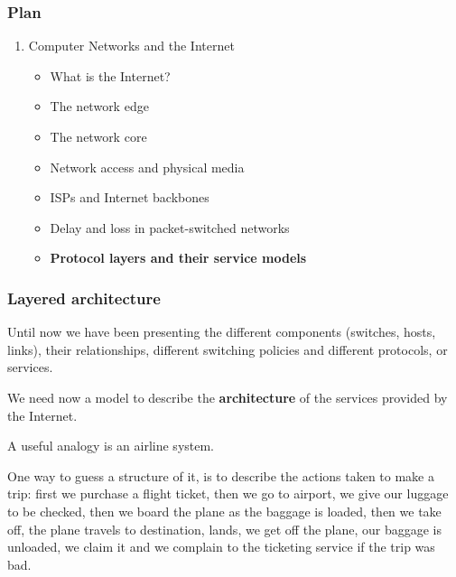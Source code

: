 
%
\begin{frame}
\frametitle{Plan}

\begin{enumerate}

  \item Computer Networks and the Internet

    \begin{itemize}

      \item What is the Internet?

      \item The network edge

      \item The network core

      \item Network access and physical media

      \item ISPs and Internet backbones

      \item Delay and loss in packet-switched networks
 
      \item \textbf{Protocol layers and their service models}

    \end{itemize}

\end{enumerate}

\end{frame}

%
\begin{frame}
\frametitle{Layered architecture}

Until now we have been presenting the different components (switches,
hosts, links), their relationships, different switching policies and
different protocols, or services.

\bigskip

We need now a model to describe the \textbf{architecture} of the
services provided by the Internet.

\bigskip

A useful analogy is an airline system.

\bigskip

One way to guess a structure of it, is to describe the actions taken
to make a trip: first we purchase a flight ticket, then we go to
airport, we give our luggage to be checked, then we board the plane as
the baggage is loaded, then we take off, the plane travels to
destination, lands, we get off the plane, our baggage is unloaded, we
claim it and we complain to the ticketing service if the trip was bad.

\end{frame}

